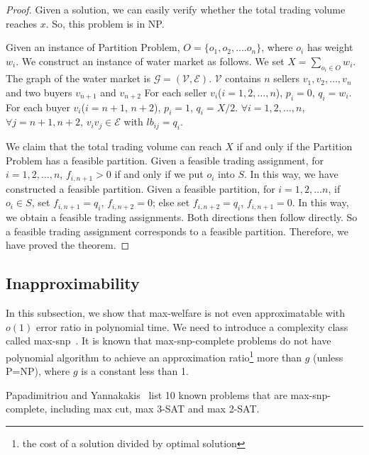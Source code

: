 \documentclass{aamas2015}
\begin{document}
\begin{proof}
Given a solution, we can easily verify whether the total trading volume reaches $x$.
So, this problem is in NP.

Given an instance of {\sc Partition Problem}, $O=\{o_1,o_2,\ldots. o_n\}$,  where $o_i$ has weight $w_i$.
We construct an instance of water market  as follows.
We set $X=\sum_{o_i\in O}w_i$.
The graph of the water market is $\mathcal{G}=(\mathcal{V},\mathcal{E})$.
$\mathcal{V}$ contains $n$ sellers $v_1,v_2,\ldots, v_n$ and two buyers $v_{n+1}$ and $v_{n+2}$
For each seller $v_i$($i=1,2,\ldots,n$), $p_i=0$, $q_i=w_i$.
For each buyer $v_i$($i=n+1$, $n+2$), $p_i=1$, $q_i=X/2$.
$\forall i=1,2,\ldots,n$, $\forall j=n+1,n+2$, $v_iv_j\in \mathcal{E}$ with $lb_{ij}=q_i$.

We claim that the total trading volume can reach $X$ if and only if the {\sc Partition Problem} has a feasible partition.
Given a feasible trading assignment, for $i=1,2,\ldots,n$, $f_{i,n+1}>0$ if and only if we put $o_{i}$ into $S$.
In this way, we have constructed a feasible partition.
Given a feasible partition, for $i=1,2,\ldots n$, if $o_i\in S$, set $f_{i,n+1}=q_i$, $f_{i,n+2}=0$; else set $f_{i,n+2}=q_i$, $f_{i,n+1}=0$.
In this way, we obtain a feasible trading assignments.
Both directions then follow directly.
So a feasible trading assignment corresponds to a feasible partition.
Therefore, we have proved the theorem.
\end{proof}
\subsection{Inapproximability}
In this subsection, we show that {\sc max-welfare} is not even approximatable with $o(1)$ error ratio in polynomial time. We need to introduce a complexity class called {\sc max-snp}~\cite{papadimitriou1991optimization}. It is known that {\sc max-snp-complete} problems do not have polynomial algorithm to achieve an approximation ratio\footnote{the cost of a solution divided by optimal solution}  more than $g$ (unless {\sc P=NP}), where $g$ is a constant less than 1.

Papadimitriou and Yannakakis~ list 10 known problems that are {\sc max-snp-complete}, including {\sc max cut}, {\sc max 3-SAT} and {\sc max 2-SAT}.
\end{document}
